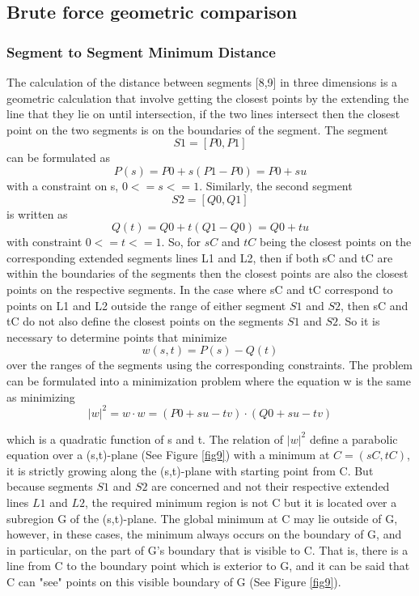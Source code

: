 \subsection{Brute force geometric comparison}

\subsubsection{Segment to Segment Minimum Distance }
The calculation of the distance between segments [8,9] in three dimensions is a geometric calculation that involve getting the closest points by the extending the line that they lie on until intersection, if the two lines intersect then the closest point on the two segments is on the boundaries of the segment.
The segment 
$$S1 = [P0, P1]$$
can be formulated as 
$$P(s) = P0+s(P1-P0) = P0+su$$
with a constraint on s, $0<=s<=1$. Similarly, the second segment 
$$S2 = [Q0, Q1]$$
is written as $$Q(t) = Q0+t(Q1-Q0) = Q0+tu$$ with constraint $0<=t<=1$. So, for $sC$ and $tC$ being the closest points on the corresponding extended segments lines L1 and L2, then if  both sC and tC are within the boundaries of the segments then the closest points are also the closest points on the respective segments. 
In the case where sC and tC correspond to points on L1 and L2 outside the range of either segment $S1$ and $S2$, then sC and tC do not also define the closest points on the segments $S1$ and $S2$. So it is necessary to determine points that minimize 
\begin{equation}
w(s,t) = P(s) - Q(t)
\end{equation}
over the ranges of the segments using the corresponding constraints. 
The problem can be formulated into a minimization problem where the equation w is the same as minimizing 
$$|w|^2 = w \cdot w= (P0+su-tv) \cdot (Q0+su-tv)$$

which is a quadratic function of s and t. The relation of $|w|^2$ define a parabolic equation over a (s,t)-plane (See Figure \ref{fig9}) with a minimum at $C = (sC, tC)$, it is strictly growing along the (s,t)-plane with starting point from C. But because segments $S1$ and $S2$ are concerned and not their respective extended lines $L1$ and $L2$, the required minimum region is not C but it is located over a subregion G of the (s,t)-plane. The global minimum at C may lie outside of G, however, in these cases, the minimum always occurs on the boundary of G, and in particular, on the part of G's boundary that is visible to C. That is, there is a line from C to the boundary point which is exterior to G, and it can be said that C can "see" points on this visible boundary of G (See Figure \ref{fig9}).

